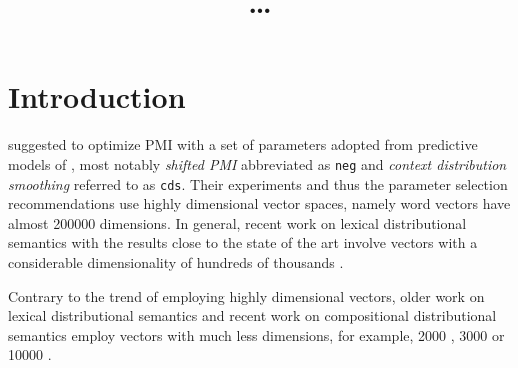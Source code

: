 \documentclass[11pt,letterpaper]{article}
\title{\ldots}
\date{}
\begin{document}
\def\emnlp/{\textit{KS2013}}
\def\PhraseRel/{PhraseRel}

\def\PMI/{$1 \operatorname{PMI}$}
\def\PPMI/{$1 \operatorname{PosPMI}$}
\def\CPMI/{$1 \operatorname{CPMI}$}
\def\PCPMI/{$1 \operatorname{PCPMI}$}

\def\NPMI/{$n \operatorname{PMI}$}
\def\NPPMI/{$n \operatorname{PosPMI}$}
\def\NCPMI/{$n \operatorname{CPMI}$}
\def\NPCPMI/{$n \operatorname{PCPMI}$}

\def\logNPMI/{$\log n\operatorname{PMI}$}
\def\logNPPMI/{$\log n\operatorname{PosPMI}$}
\def\logNCPMI/{$\log n \operatorname{CPMI}$}
\def\logNPCPMI/{$\log n \operatorname{PCPMI}$}


\maketitle
\begin{abstract}

\end{abstract}

\section{Introduction}
\label{sec:introduction}

 suggested to optimize PMI with a  set of parameters adopted from predictive models of , most notably \emph{shifted PMI} abbreviated as \texttt{neg} and \emph{context distribution smoothing} referred to as \texttt{cds}. Their experiments and thus the parameter selection recommendations use highly dimensional vector spaces, namely word vectors have almost 200000 dimensions. In general, recent work on lexical distributional semantics with the results close to the state of the art involve vectors with a considerable dimensionality of hundreds of thousands \cite{baroni-dinu-kruszewski:2014:P14-1,kiela-clark:2014:CVSC}.

Contrary to the trend of employing highly dimensional vectors, older work on lexical distributional semantics and recent work on compositional distributional semantics employ vectors with much less dimensions, for example, 2000 \cite{Grefenstette:2011:ESC:2145432.2145580,kartsadrqpl2014,milajevs-EtAl:2014:EMNLP2014}, 3000 \cite{Dinu:2010:MDS:1870658.1870771,milajevs-purver:2014:CVSC} or 10000 \cite{polajnar-clark:2014:EACL,Baroni2010nouns}.
\end{document}
